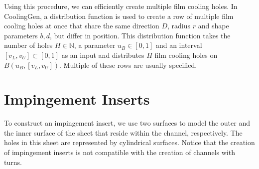 \documentclass[a4paper, 11pt]{report}
\theoremstyle{definition}
\begin{document}
	Using this procedure, we can efficiently create multiple film cooling holes. In CoolingGen, a distribution function is used to create a row of multiple film cooling holes at once that share the same direction $D$, radius $r$ and shape parameters $b, d$, but differ in position. This distribution function takes the number of holes $H \in \mathbb{N}$, a parameter $u_B \in [0,1]$ and an interval $[v_L, v_U] \subset [0,1]$ as an input and distributes $H$ film cooling holes on $B(u_B, [v_L, v_U])$. Multiple of these rows are usually specified.

\section{Impingement Inserts}
	To construct an impingement insert, we use two surfaces to model the outer and the inner surface of the sheet that reside within the channel, respectively. The holes in this sheet are represented by cylindrical surfaces. Notice that the creation of impingement inserts is not compatible with the creation of channels with turns.
\end{document}
